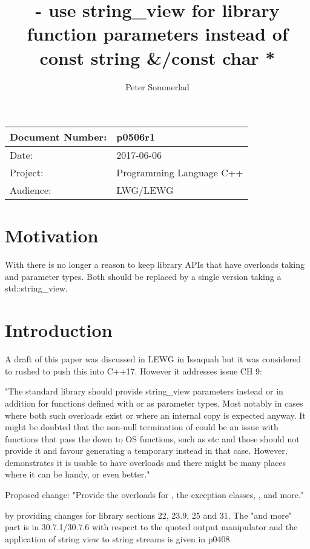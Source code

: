 \documentclass[ebook,11pt,article]{memoir}
\title{\papernumber{} - use string\_view for library function parameters instead of const string \&/const char *}
\author{Peter Sommerlad}
\date{\paperdate}                        %
\newcommand{\papernumber}{p0506r1}
\newcommand{\paperdate}{2017-06-06}
\begin{document}
\maketitle
\begin{tabular}[t]{|l|l|}\hline 
Document Number:& \papernumber  \\\hline
Date: & \paperdate \\\hline
Project: & Programming Language C++\\\hline 
Audience: & LWG/LEWG\\\hline
\end{tabular} 

\chapter{Motivation}
With  there is no longer a reason to keep library APIs that have overloads taking  and  parameter types. Both should be replaced by a single version taking a std::string_view.

\chapter{Introduction}

A draft of this paper was discussed in LEWG in Issaquah but it was considered to rushed to push this into C++17. However it addresses issue CH 9:

"The standard library should provide string_view parameters instead or in addition for functions defined with  or  as parameter types. Most notably in cases where both such overloads exist or where an internal copy is expected anyway.
It might be doubted that the non-null termination of  could be an issue with functions that pass the  down to OS functions, such as  etc and those should not provide it and favour generating a  temporary instead in that case. However,  demonstrates it is usable to have  overloads and there might be many places where it can be handy, or even better."

Proposed change: "Provide the overloads for , the exception classes, ,  and more."

by providing changes for library sections 22, 23.9, 25 and 31. The "and more" part is in 30.7.1/30.7.6 with respect to the quoted output manipulator and the application of string view to string streams is given in p0408.
\end{document}
